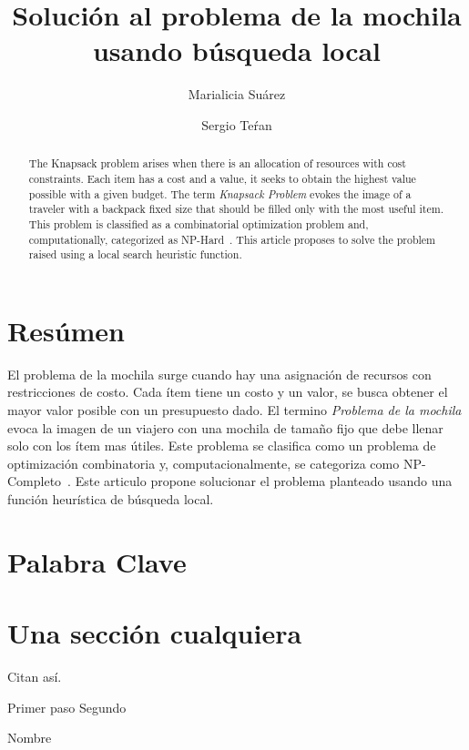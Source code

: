 \documentclass{ci5652}
\title{Solución al problema de la mochila usando búsqueda local}
\author{Marialicia Suárez
        \and
        Sergio Teŕan}
\begin{document}
\thispagestyle{empty}
\maketitle


\section*{Resúmen}
El problema de la mochila surge cuando hay una asignación de recursos con restricciones de costo. Cada ítem tiene un costo y un valor, se busca obtener el mayor valor posible con un presupuesto dado. El termino \textit{Problema de la mochila} evoca la imagen de un viajero con una mochila de tamaño fijo que debe llenar solo con los ítem mas útiles. Este problema se clasifica como un problema de optimización combinatoria y, computacionalmente, se categoriza como NP-Completo~\cite{c_resumen_01}. Este articulo propone solucionar el problema planteado usando una función heurística de búsqueda local.

\section*{Palabra Clave}


\begin{abstract}
The Knapsack problem arises when there is an allocation of resources with cost constraints. Each item has a cost and a value, it seeks to obtain the highest value possible with a given budget. The term \textit{Knapsack Problem} evokes the image of a traveler with a backpack fixed size that should be filled only with the most useful item. This problem is classified as a combinatorial optimization problem and, computationally, categorized as NP-Hard~\cite{c_resumen_01}. This article proposes to solve the problem raised using a local search heuristic function.
\end{abstract}

\section{Una sección cualquiera}
Citan así.

\begin{algorithm}
 \DontPrintSemicolon
 \vspace*{0.1cm}
 Primer paso\;
 Segundo\;
 \vspace*{0.1cm}
 \caption{Nombre}
\end{algorithm}
\end{document}
